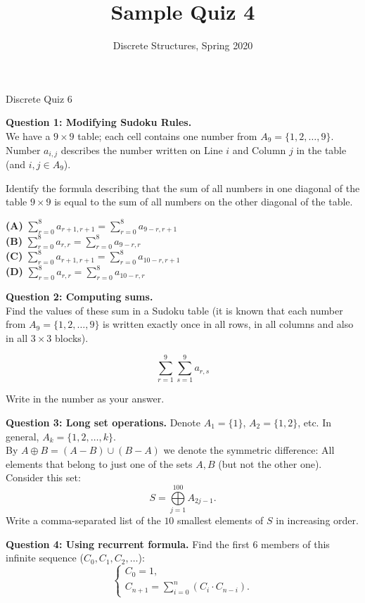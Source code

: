 \documentclass[jou]{apa6}
\title{Sample Quiz 4}
\author{Discrete Structures, Spring 2020}
\affiliation{RBS}
\begin{document}
\thispagestyle{empty}

\twocolumn
{\Large Discrete Quiz 6}

\vspace{10pt}
{\bf Question 1: Modifying Sudoku Rules.}\\ 
We have a $9 \times 9$ table; each cell contains one number from 
$A_9 = \{ 1, 2,\ldots, 9 \}$. 
Number $a_{i,j}$ describes the number written on Line $i$ and
Column $j$ in the table (and $i,j \in A_9$). 

Identify the formula describing that the sum of all numbers in one 
diagonal of the table $9 \times 9$ is equal to the sum of all numbers
on the other diagonal of the table.

{\bf (A)} ${\displaystyle \sum\limits_{r=0}^{8} a_{r+1,r+1} = \sum\limits_{r=0}^{8} a_{9-r,r+1}}$\\
{\bf (B)} ${\displaystyle \sum\limits_{r=0}^{8} a_{r,r} = \sum\limits_{r=0}^{8} a_{9-r,r}}$\\
{\bf (C)} ${\displaystyle \sum\limits_{r=0}^{8} a_{r+1,r+1} = \sum\limits_{r=0}^{8} a_{10-r,r+1}}$\\
{\bf (D)} ${\displaystyle \sum\limits_{r=0}^{8} a_{r,r} = \sum\limits_{r=0}^{8} a_{10-r,r}}$

\vspace{6pt}
{\bf Question 2: Computing sums.}\\ 
Find the values of these sum in a Sudoku table (it is known that each number from $A_9 = \{ 1, 2,\ldots, 9 \}$ 
is written exactly once in all rows, in all columns and also in all $3 \times 3$ blocks). 


$${\displaystyle \sum\limits_{r=1}^{9} \sum\limits_{s=1}^{9} a_{r,s}}$$

Write in the number as your answer.




\vspace{6pt}
{\bf Question 3: Long set operations.} Denote $A_1 = \{ 1 \}$, $A_2 = \{ 1,2 \}$, etc. 
In general, $A_k = \{ 1,2,\ldots,k\}$.\\ 
By $A \oplus B = (A - B) \cup (B-A)$
we denote the symmetric difference: All elements that belong to just one of the
sets $A,B$ (but not the other one). 
Consider this set:
$$S = \bigoplus\limits_{j=1}^{100} A_{2j-1}.$$
Write a comma-separated list of the $10$ smallest elements of $S$ in 
increasing order.


\vspace{6pt}
{\bf Question 4: Using recurrent formula.}
Find the first $6$ members of this infinite sequence ($C_0,C_1,C_2,\ldots$): 
$$\left\{ \begin{array}{l} 
C_0 = 1,\\
C_{n+1} = \sum\limits_{i=0}^n (C_i \cdot C_{n-i}).
\end{array} \right.$$
\end{document}
